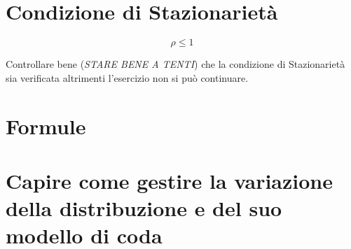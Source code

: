 \section{Condizione di Stazionarietà}

$$
    \rho \le 1
$$

Controllare bene (\textit{STARE BENE A TENTI}) che la condizione di
Stazionarietà sia verificata altrimenti l'esercizio non si può continuare.

\section{Formule}


\section{Capire come gestire la variazione della distribuzione e del suo modello di coda}
